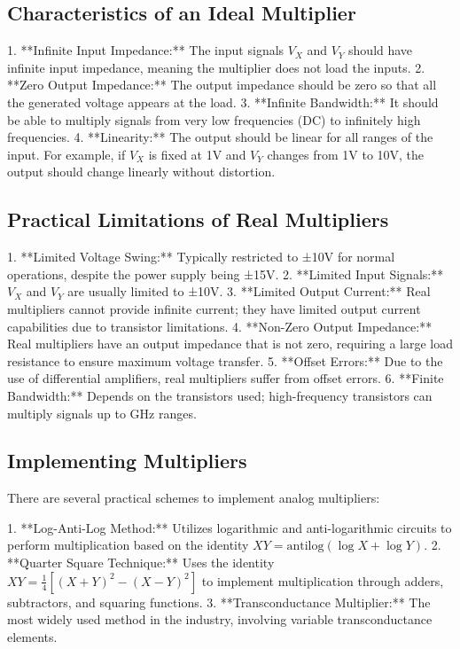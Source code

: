 \subsection*{Characteristics of an Ideal Multiplier}

1. **Infinite Input Impedance:** The input signals \( V_X \) and \( V_Y \) should have infinite input impedance, meaning the multiplier does not load the inputs.
2. **Zero Output Impedance:** The output impedance should be zero so that all the generated voltage appears at the load.
3. **Infinite Bandwidth:** It should be able to multiply signals from very low frequencies (DC) to infinitely high frequencies.
4. **Linearity:** The output should be linear for all ranges of the input. For example, if \( V_X \) is fixed at 1V and \( V_Y \) changes from 1V to 10V, the output should change linearly without distortion.

\subsection*{Practical Limitations of Real Multipliers}

1. **Limited Voltage Swing:** Typically restricted to ±10V for normal operations, despite the power supply being ±15V.
2. **Limited Input Signals:** \( V_X \) and \( V_Y \) are usually limited to ±10V.
3. **Limited Output Current:** Real multipliers cannot provide infinite current; they have limited output current capabilities due to transistor limitations.
4. **Non-Zero Output Impedance:** Real multipliers have an output impedance that is not zero, requiring a large load resistance to ensure maximum voltage transfer.
5. **Offset Errors:** Due to the use of differential amplifiers, real multipliers suffer from offset errors.
6. **Finite Bandwidth:** Depends on the transistors used; high-frequency transistors can multiply signals up to GHz ranges.

\subsection*{Implementing Multipliers}

There are several practical schemes to implement analog multipliers:

1. **Log-Anti-Log Method:** Utilizes logarithmic and anti-logarithmic circuits to perform multiplication based on the identity \( XY = \text{antilog}(\log X + \log Y) \).
2. **Quarter Square Technique:** Uses the identity \( XY = \frac{1}{4}[(X + Y)^2 - (X - Y)^2] \) to implement multiplication through adders, subtractors, and squaring functions.
3. **Transconductance Multiplier:** The most widely used method in the industry, involving variable transconductance elements.

